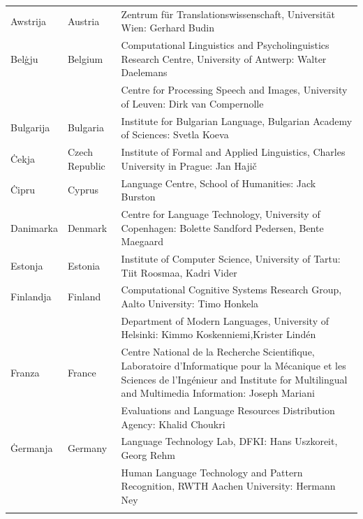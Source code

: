 \begin{longtable}{@{}llp{113mm}@{}}
  Awstrija & \textcolor{grey1}{Austria} & Zentrum für Translationswissenschaft, Universität Wien: Gerhard Budin\\ \addlinespace 
  Belġju & \textcolor{grey1}{Belgium} & Computational Linguistics and Psycholinguistics Research Centre, University of Antwerp: Walter Daelemans\\ \addlinespace
  & & Centre for Processing Speech and Images, University of Leuven: Dirk van Compernolle \\ \addlinespace
  Bulgarija & \textcolor{grey1}{Bulgaria} & Institute for Bulgarian Language, Bulgarian Academy of Sciences: Svetla Koeva\\ \addlinespace
  Ċekja & \textcolor{grey1}{Czech Republic} & Institute of Formal and Applied Linguistics, Charles University in Prague: Jan Hajič\\ \addlinespace
  Ċipru & \textcolor{grey1}{Cyprus} & Language Centre, School of Humanities: Jack Burston\\ \addlinespace
  Danimarka &  \textcolor{grey1}{Denmark} & Centre for Language Technology, University of Copenhagen: \newline Bolette Sandford Pedersen, Bente Maegaard\\ \addlinespace
  Estonja & \textcolor{grey1}{Estonia} & Institute of Computer Science, University of Tartu: Tiit Roosmaa, Kadri Vider\\ \addlinespace
  Finlandja & \textcolor{grey1}{Finland} & Computational Cognitive Systems Research Group, Aalto University: Timo Honkela\\ \addlinespace
  & & Department of Modern Languages, University of Helsinki: Kimmo Koskenniemi,\newline Krister Lindén \\ \addlinespace
  Franza & \textcolor{grey1}{France} & Centre National de la Recherche Scientifique, Laboratoire d'Informatique pour la Mécanique et les Sciences de l'Ingénieur and Institute for Multilingual and Multimedia Information: Joseph Mariani \\ \addlinespace
  & & Evaluations and Language Resources Distribution Agency: Khalid Choukri\\ \addlinespace 
  Ġermanja & \textcolor{grey1}{Germany} & Language Technology Lab, DFKI: Hans Uszkoreit, Georg Rehm\\ \addlinespace
  & & Human Language Technology and Pattern Recognition, RWTH Aachen University: Hermann Ney \\ \addlinespace

\end{longtable}

